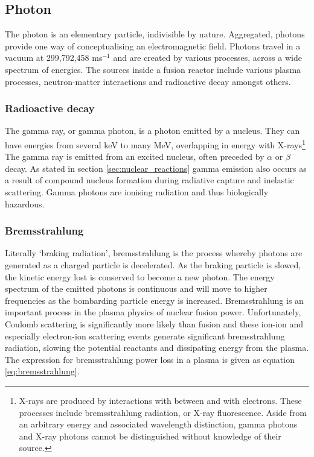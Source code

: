 \subsection{Photon}
The photon is an elementary particle, indivisible by nature. Aggregated, photons provide one way of conceptualising an electromagnetic field. Photons travel in a vacuum at 299,792,458 ms$^{-1}$ and are created by various processes, across a wide spectrum of energies. The sources inside a fusion reactor include various plasma processes, neutron-matter interactions and radioactive decay amongst others. 

\subsubsection{Radioactive decay}
The gamma ray, or gamma photon, is a photon emitted by a nucleus. They can have energies from several keV to many MeV, overlapping in energy with X-rays\footnote{X-rays are produced by interactions with between and with electrons. These processes include bremsstrahlung radiation, or X-ray fluorescence. Aside from an arbitrary energy and associated wavelength distinction, gamma photons and X-ray photons cannot be distinguished without knowledge of their source.} The gamma ray is emitted from an excited nucleus, often preceded by $\alpha$ or $\beta$ decay. As stated in section \ref{sec:nuclear_reactions} gamma emission also occurs as a result of compound nucleus formation during radiative capture and inelastic scattering. Gamma photons are ionising radiation and thus biologically hazardous. 

\subsubsection{Bremsstrahlung}
Literally `braking radiation', bremsstrahlung is the process whereby photons are generated as a charged particle is decelerated. As the braking particle is slowed, the kinetic energy lost is conserved to become a new photon. The energy spectrum of the emitted photons is continuous and will move to higher frequencies as the bombarding particle energy is increased. Bremsstrahlung is an important process in the plasma physics of nuclear fusion power. Unfortunately, Coulomb scattering is significantly more likely than fusion and these ion-ion and especially electron-ion scattering events generate significant bremsstrahlung radiation, slowing the potential reactants and dissipating energy from the plasma. The expression for bremsstrahlung power loss in a plasma is given as equation \ref{eq:bremsstrahlung}. 

